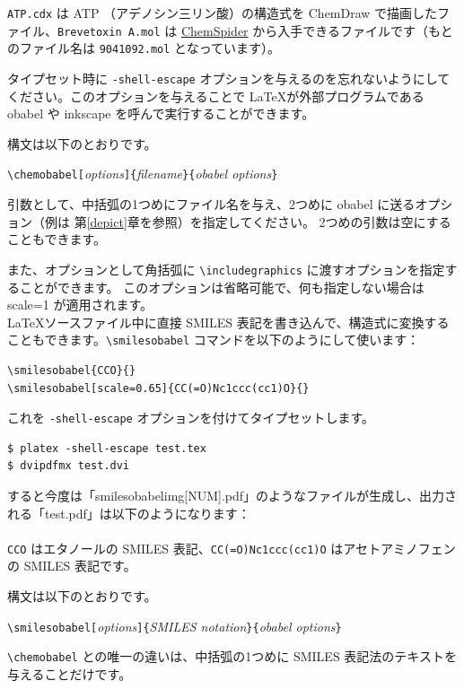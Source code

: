 \documentclass[12pt]{jsarticle}
\begin{document}
\verb|ATP.cdx| は ATP （アデノシン三リン酸）の構造式を ChemDraw で描画したファイル、\verb|Brevetoxin A.mol| は \href{http://www.chemspider.com/}{ChemSpider} から入手できるファイルです（もとのファイル名は \verb|9041092.mol| となっています）。

タイプセット時に \verb|-shell-escape| オプションを与えるのを忘れないようにしてください。このオプションを与えることで \LaTeX が外部プログラムである obabel や inkscape を呼んで実行することができます。

構文は以下のとおりです。
\begin{center}
\verb|\chemobabel[|\textit{options}\verb|]{|\textit{filename}\verb|}{|\textit{obabel options}\verb|}|
\end{center}
引数として、中括弧の1つめにファイル名を与え、2つめに obabel に送るオプション（例は
第\ref{depict}章を参照）を指定してください。
2つめの引数は空にすることもできます。

また、オプションとして角括弧に \verb|\includegraphics| に渡すオプションを指定することができます。
このオプションは省略可能で、何も指定しない場合は scale=1 が適用されます。 \\

\LaTeX ソースファイル中に直接 SMILES 表記を書き込んで、構造式に変換することもできます。\verb|\smilesobabel| コマンドを以下のようにして使います：
\begin{verbatim}
\smilesobabel{CCO}{}
\smilesobabel[scale=0.65]{CC(=O)Nc1ccc(cc1)O}{}
\end{verbatim}
これを \verb|-shell-escape| オプションを付けてタイプセットします。
\begin{verbatim}
$ platex -shell-escape test.tex
$ dvipdfmx test.dvi
\end{verbatim}
すると今度は「smilesobabelimg[NUM].pdf」のようなファイルが生成し、出力される「test.pdf」は以下のようになります： \\
 \\
\verb|CCO| はエタノールの SMILES 表記、\verb|CC(=O)Nc1ccc(cc1)O| はアセトアミノフェンの SMILES 表記です。

構文は以下のとおりです。
\begin{center}
\verb|\smilesobabel[|\textit{options}\verb|]{|\textit{SMILES notation}\verb|}{|\textit{obabel options}\verb|}|
\end{center}
\verb|\chemobabel| との唯一の違いは、中括弧の1つめに SMILES 表記法のテキストを与えることだけです。 \\
\end{document}
